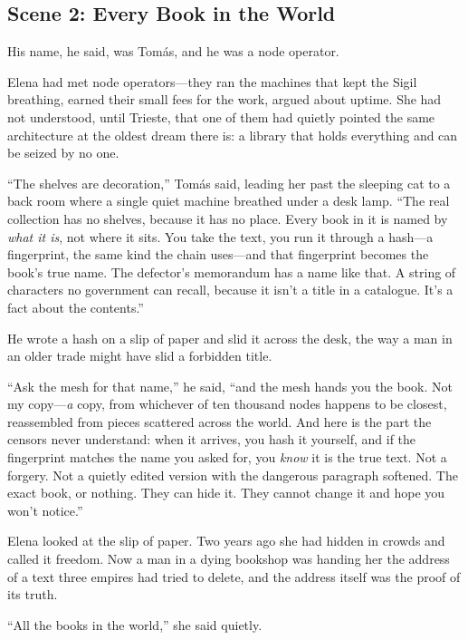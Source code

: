 \hypertarget{scene-2-every-book-in-the-world}{%
\subsection{Scene 2: Every Book in the
World}\label{scene-2-every-book-in-the-world}}

His name, he said, was Tomás, and he was a node operator.

Elena had met node operators---they ran the machines that kept the Sigil
breathing, earned their small fees for the work, argued about uptime. She had not
understood, until Trieste, that one of them had quietly pointed the same
architecture at the oldest dream there is: a library that holds everything and can
be seized by no one.

``The shelves are decoration,'' Tomás said, leading her past the sleeping cat to a
back room where a single quiet machine breathed under a desk lamp. ``The real
collection has no shelves, because it has no place. Every book in it is named by
\emph{what it is}, not where it sits. You take the text, you run it through a
hash---a fingerprint, the same kind the chain uses---and that fingerprint becomes
the book's true name. The defector's memorandum has a name like that. A string of
characters no government can recall, because it isn't a title in a catalogue. It's
a fact about the contents.''

He wrote a hash on a slip of paper and slid it across the desk, the way a man in an
older trade might have slid a forbidden title.

``Ask the mesh for that name,'' he said, ``and the mesh hands you the book. Not my
copy---\emph{a} copy, from whichever of ten thousand nodes happens to be closest,
reassembled from pieces scattered across the world. And here is the part the censors
never understand: when it arrives, you hash it yourself, and if the fingerprint
matches the name you asked for, you \emph{know} it is the true text. Not a
forgery. Not a quietly edited version with the dangerous paragraph softened. The
exact book, or nothing. They can hide it. They cannot change it and hope you won't
notice.''

Elena looked at the slip of paper. Two years ago she had hidden in crowds and
called it freedom. Now a man in a dying bookshop was handing her the address of a
text three empires had tried to delete, and the address itself was the proof of its
truth.

``All the books in the world,'' she said quietly.


